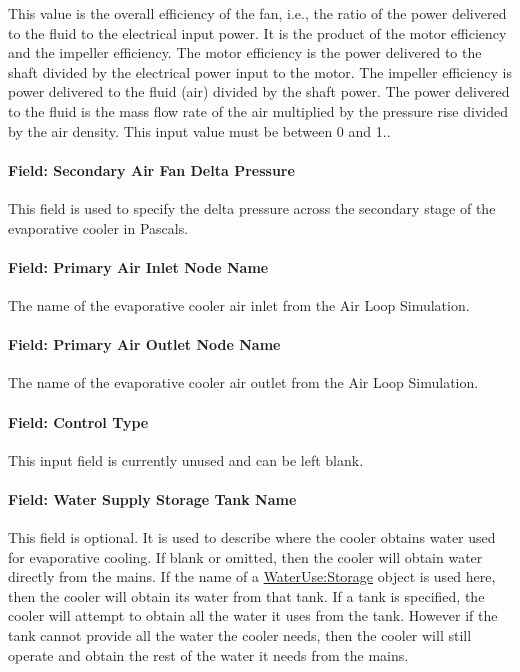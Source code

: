 This value is the overall efficiency of the fan, i.e., the ratio of the power delivered to the fluid to the electrical input power. It is the product of the motor efficiency and the impeller efficiency. The motor efficiency is the power delivered to the shaft divided by the electrical power input to the motor. The impeller efficiency is power delivered to the fluid (air) divided by the shaft power. The power delivered to the fluid is the mass flow rate of the air multiplied by the pressure rise divided by the air density. This input value must be between 0 and 1..

\paragraph{Field: Secondary Air Fan Delta Pressure}\label{field-secondary-air-fan-delta-pressure}

This field is used to specify the delta pressure across the secondary stage of the evaporative cooler in Pascals.

\paragraph{Field: Primary Air Inlet Node Name}\label{field-primary-air-inlet-node-name-1}

The name of the evaporative cooler air inlet from the Air Loop Simulation.

\paragraph{Field: Primary Air Outlet Node Name}\label{field-primary-air-outlet-node-name-1}

The name of the evaporative cooler air outlet from the Air Loop Simulation.

\paragraph{Field: Control Type}\label{field-control-type-2}

This input field is currently unused and can be left blank.

\paragraph{Field: Water Supply Storage Tank Name}\label{field-water-supply-storage-tank-name-3}

This field is optional. It is used to describe where the cooler obtains water used for evaporative cooling. If blank or omitted, then the cooler will obtain water directly from the mains. If the name of a \hyperref[waterusestorage]{WaterUse:Storage} object is used here, then the cooler will obtain its water from that tank. If a tank is specified, the cooler will attempt to obtain all the water it uses from the tank. However if the tank cannot provide all the water the cooler needs, then the cooler will still operate and obtain the rest of the water it needs from the mains.

